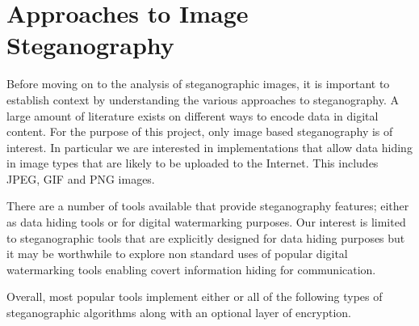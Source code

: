 \documentclass[12pt]{extreport}
\begin{document}
\section{Approaches to Image Steganography}
\label{sec:overview}
Before moving on to the analysis of steganographic images, it is important to establish context by understanding the various approaches to steganography. A large amount of literature exists on different ways to encode data in digital content. For the purpose of this project, only image based steganography is of interest. In particular we are interested in implementations that allow data hiding in image types that are likely to be uploaded to the Internet. This includes JPEG, GIF and PNG images.
\par There are a number of tools available that provide steganography features; either as data hiding tools or for digital watermarking purposes. Our interest is limited to steganographic tools that are explicitly designed for data hiding purposes but it may be worthwhile to explore non standard uses of popular digital watermarking tools enabling covert information hiding for communication. 
\par Overall, most popular tools implement either or all of the following types of steganographic algorithms along with an optional layer of encryption.
\end{document}
